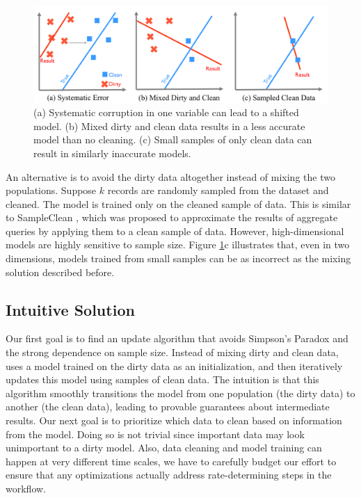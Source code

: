\begin{figure}[ht!]
\centering
 \includegraphics[width=\columnwidth]{figs/update-arch.png}
 \caption{(a) Systematic corruption in one variable can lead to a shifted model. 
 (b) Mixed dirty and clean data results in a less accurate model than no cleaning.
(c) Small samples of only clean data can result in similarly inaccurate models. \label{update-arch1}}
\end{figure}

An alternative is to avoid the dirty data altogether instead of mixing the two populations.
Suppose $k$ records are randomly sampled from the dataset and cleaned.
The model is trained only on the cleaned sample of data.
This is similar to SampleClean \cite{wang1999sample}, which was proposed to approximate the results of aggregate queries by applying them to a clean sample of data.
However, high-dimensional models are highly sensitive to sample size.
Figure \ref{update-arch1}c illustrates that, even in two dimensions, models trained from small samples can be as incorrect as the mixing solution described before.

\subsection{Intuitive Solution}
Our first goal is to find an update algorithm that avoids Simpson's Paradox and the strong dependence on sample size.
Instead of mixing dirty and clean data, \sys uses a model trained on the dirty data as an initialization, and then iteratively updates this model using samples of clean data.
The intuition is that this algorithm smoothly transitions the model from one population (the dirty data) to another (the clean data), leading to provable guarantees about intermediate results.
Our next goal is to prioritize which data to clean based on information from the model.
Doing so is not trivial since important data may look unimportant to a dirty model.
Also, data cleaning and model training can happen at very different time scales, we have to carefully budget our effort to ensure that any optimizations actually address rate-determining steps in the workflow.

